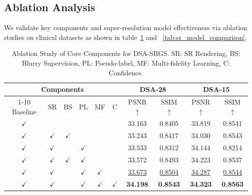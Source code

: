 \documentclass[runningheads]{llncs}
\begin{document}
\subsection{Ablation Analysis}%

We validate key components and super-resolution model effectiveness via ablation studies on clinical datasets as shown in table~\ref{tab:ablation_study_final} and ~\ref{tab:sr_model_comparison}.

\begin{table}[t]
\centering
\caption{Ablation Study of Core Components for DSA-SRGS. SR: SR Rendering, BS: Blurry Supervision, PL: Pseudo-label, MF: Multi-fidelity Learning, C: Confidence.}
\label{tab:ablation_study_final}
\setlength{\tabcolsep}{5pt}
\footnotesize
\begin{tabular}{cccccc|cc|cc}
\toprule
\multicolumn{6}{c|}{Components} & \multicolumn{2}{c|}{DSA-28} & \multicolumn{2}{c}{DSA-15} \\
\cmidrule{1-10}
Baseline & SR & BS & PL & MF & C & PSNR $\uparrow$ & SSIM $\uparrow$ & PSNR $\uparrow$ & SSIM $\uparrow$ \\
\midrule
$\checkmark$ & & & & & & 33.163 & 0.8405 & 33.819 & 0.8541 \\
$\checkmark$ & $\checkmark$ & $\checkmark$ & & & & 33.243 & 0.8417 & 34.030 & 0.8543 \\
$\checkmark$ & $\checkmark$ & & $\checkmark$ & & & 33.533 & 0.8312 & 34.144 & 0.8214 \\
$\checkmark$ & $\checkmark$ & $\checkmark$ & $\checkmark$ & & & 33.572 & 0.8493 & 34.223 & 0.8537 \\
$\checkmark$ & $\checkmark$ & & $\checkmark$ & $\checkmark$ & & \underline{33.673} & \underline{0.8504} & \underline{34.287} & \underline{0.8544} \\
$\checkmark$ & $\checkmark$ & & $\checkmark$ & $\checkmark$ & $\checkmark$ & \textbf{34.198} & \textbf{0.8543} & \textbf{34.323} & \textbf{0.8563} \\
\bottomrule
\end{tabular}
\end{table}
\end{document}
